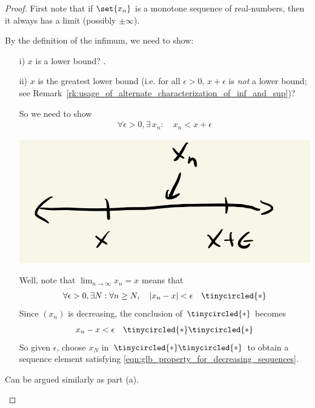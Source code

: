 \documentclass{article} %
\begin{document}
\begin{proof}
First note that if $\set{x_n}$ is a monotone sequence of real-numbers, then it always has a limit (possibly $\pm \infty$). 

\begin{alphabate}
\item By the definition of the infimum, we need to show:

\begin{itemize}
\item[i)] $x$ is a lower bound? \greencheck.
\item[ii)]	$x$ is the greatest lower bound (i.e. for all $\epsilon > 0$, $x+ \epsilon$ is \textit{not} a lower bound;  see Remark~\ref{rk:usage_of_alternate_characterization_of_inf_and_sup})? 

So we need to show 
\begin{align}
 \forall \epsilon > 0, \exists\, x_n :  \quad x_n < x + \epsilon
\label{eqn:glb_property_for_decreasing_sequences}
\end{align}

\begin{center}
\includegraphics[width=.4\linewidth]{images/lim_of_decreasing_sequence_is_infimum}
\end{center}

Well, note that $\lim_{n \to \infty} x_n = x$ means that 
%
\begin{align*}
\forall \epsilon>0 , \exists N : \forall n \geq N, \quad 
 |x_n - x | < \epsilon && \tinycircled{\ast} 
\end{align*} 
Since $(x_n)$ is decreasing, the conclusion of  $\tinycircled{\ast}$ becomes 
\begin{align*}
x_n - x  < \epsilon && \tinycircled{\ast}\tinycircled{\ast} 
\end{align*} 
So given $\epsilon$, choose $x_N$ in $\tinycircled{\ast} \tinycircled{\ast}$ to obtain a sequence element satisfying \eqref{eqn:glb_property_for_decreasing_sequences}.
\end{itemize}

\item Can be argued similarly as part (a).
\end{alphabate}
  
\end{proof}
\end{document}

